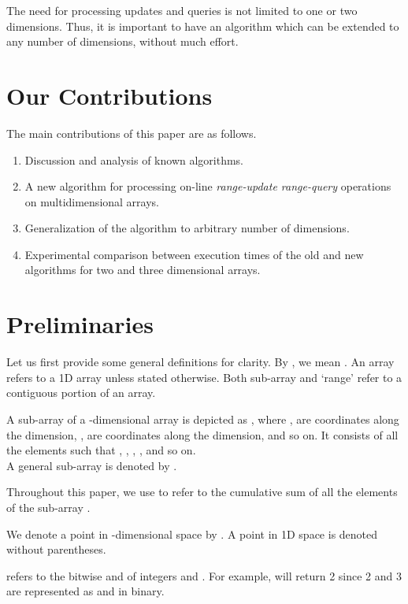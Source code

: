 \documentclass[a4paper]{article}
\begin{document}
\vspace{2 mm}
The need for processing updates and queries is not limited to one or two dimensions. Thus, it is important to have an algorithm which can be extended to any number of dimensions, without much effort.



\section{Our Contributions}
The main contributions of this paper are as follows.

\begin{enumerate}
\item Discussion and analysis of known algorithms.
\item A new algorithm for processing on-line \textit{range-update range-query} operations on multidimensional arrays.
\item Generalization of the algorithm to arbitrary number of dimensions.
\item Experimental comparison between execution times of the old and new algorithms for two and three dimensional arrays.
\end{enumerate}



\section{Preliminaries}
Let us first provide some general definitions for clarity. By , we mean . An array refers to a 1D array unless stated otherwise. Both sub-array and `range' refer to a contiguous portion of an array.

\vspace{2 mm}
A sub-array of a -dimensional array  is depicted as , where ,  are coordinates along the  dimension, ,  are coordinates along the  dimension, and so on. It consists of all the elements  such that , , , , and so on.\\
A general sub-array is denoted by .

\vspace{2 mm}
Throughout this paper, we use  to refer to the cumulative sum of all the elements of the sub-array .

\vspace{2mm}
We denote a point in -dimensional space by . A point in 1D space is denoted without parentheses.

\vspace{2 mm}
 refers to the bitwise and of integers  and . For example,  will return 2 since 2 and 3 are represented as  and  in binary.
\end{document}
